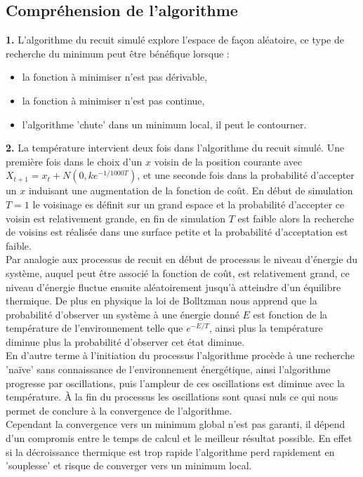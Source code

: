 \documentclass[12pt]{article}
\begin{document}
\subsection{Compréhension de l’algorithme}
\textbf{\color{brick}1.} L'algorithme du recuit simulé explore l'espace de façon aléatoire, ce type de recherche du minimum peut être bénéfique lorsque :
\begin{itemize}
    \item la fonction à minimiser n'est pas dérivable,
    \item la fonction à minimiser n'est pas continue,
    \item l'algorithme 'chute' dans un minimum local, il peut le contourner.
\end{itemize}
\textbf{\color{brick}2.} La température intervient deux fois dans l'algorithme du recuit simulé. Une première fois dans le choix d'un $x$ voisin de la position courante avec $X_{t+1}= x_t + N(0, ke^{-1/1000T})$, et une seconde fois dans la probabilité d'accepter un $x$ induisant une augmentation de la fonction de coût. En début de simulation  $T =1$ le voisinage es définit sur un grand espace et la probabilité d'accepter ce voisin est relativement grande, en fin de simulation $T$ est faible alors la recherche de voisins est réalisée dans une surface petite et la probabilité d'acceptation est faible. \\
Par analogie aux processus de recuit en début de processus le niveau d'énergie du système, auquel peut être associé la fonction de coût, est relativement grand, ce niveau d'énergie fluctue ensuite aléatoirement jusqu'à atteindre d'un équilibre thermique. De plus en physique la loi de Bolltzman nous apprend que la probabilité d'observer un système à une énergie donné $E$ est fonction de la température de l'environnement telle que $e^{-E/T}$, ainsi plus la température diminue plus la probabilité d'observer cet état diminue.  \\
En d'autre terme à l'initiation du processus l'algorithme procède à une recherche 'naïve' sans connaissance de l'environnement énergétique, ainsi l'algorithme progresse  par  oscillations, puis l'ampleur de ces oscillations est diminue avec la température. À la fin du processus les oscillations sont quasi nuls ce qui nous permet de conclure à la convergence de l'algorithme.\\
Cependant la convergence vers un minimum global n'est pas garanti, il dépend d'un compromis entre le temps de calcul et le meilleur résultat possible. En effet si la décroissance thermique est trop rapide l'algorithme perd rapidement en 'souplesse' et risque de converger vers un minimum local.

\end{document}
